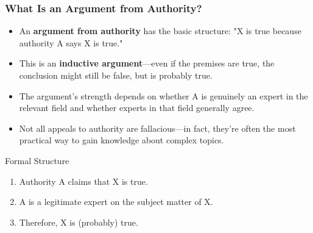 \documentclass{beamer}
\begin{document}
	\begin{frame}
		\frametitle{What Is an Argument from Authority?}
		\begin{itemize}
			\item An \textbf{argument from authority} has the basic structure: "X is true because authority A says X is true."
			\item This is an \textbf{inductive argument}—even if the premises are true, the conclusion might still be false, but is probably true.
			\item The argument's strength depends on whether A is genuinely an expert in the relevant field and whether experts in that field generally agree.
			\item Not all appeals to authority are fallacious—in fact, they're often the most practical way to gain knowledge about complex topics.
		\end{itemize}
		
		\begin{block}{Formal Structure}
			\begin{enumerate}
				\item Authority A claims that X is true.
				\item A is a legitimate expert on the subject matter of X.
				\item Therefore, X is (probably) true.
			\end{enumerate}
		\end{block}
	\end{frame}
	
\end{document}
